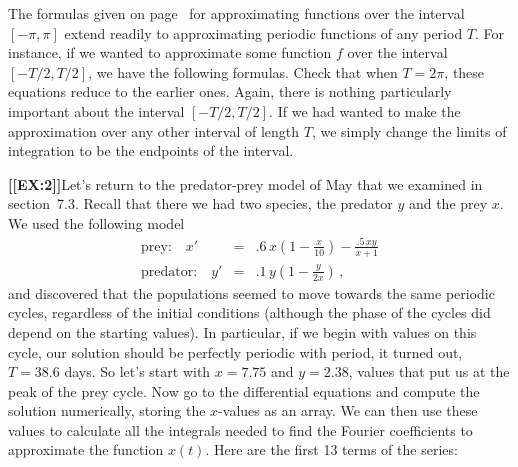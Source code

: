 {{{{The formulas given on page~\pageref{fourforms} for approximating functions over the interval $[-\pi,\pi]$ extend readily to approximating periodic functions of  any period $T$.  For instance, if we wanted to approximate some function $f$ over the interval $[-T/2,T/2]$, we have 
the following formulas.  Check that when $T=2\pi$, these equations reduce to the earlier ones.  Again, there is nothing particularly important about the interval $[-T/2,T/2]$.  If we had wanted to make the approximation
 over any other interval of length $T$, we simply change the limits of integration to be the endpoints of the interval.



\noindent
\begin{center}
\end{center}

\medskip



{\bf [[EX:2]]}\quad Let's return to the 
predator-prey model of May that we examined in section~7.3.  Recall that there we had two species, the predator $y$ and the prey $x$.  We used the following model
	\begin{eqnarray*}
	\mbox{prey:} \quad x' &=& 
		.6\,x\left(1-\frac{x}{10}\right) - \frac{.5\,xy}{x+1} \\
	\mbox{predator:} \quad y' &=& .1\,y\left(1-\frac{y}{2x}\right)\,,
	\end{eqnarray*}
and discovered that the populations seemed to move towards the same periodic cycles, regardless of the initial conditions (although the phase of the cycles did depend on the starting values).  In particular, if we begin with values on this cycle, our solution should be perfectly periodic with period, it turned out, $T=38.6$ days.  So let's start with $x=7.75$ and $y=2.38$, values that put us at the peak of the prey cycle.  Now go to the differential equations and compute the solution numerically, storing the $x$-values as an array. We can then use these values to calculate all the integrals needed to find the Fourier coefficients to approximate the function $x(t)$.  Here are the first 13 terms of the series:

}}}}
